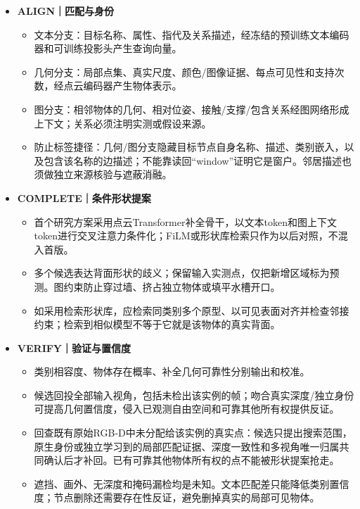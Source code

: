 \documentclass[UTF8,fontset=fandol]{ctexart}
\begin{document}
\begin{itemize}
\item \textbf{ALIGN｜匹配与身份}


\begin{itemize}
\item 文本分支：目标名称、属性、指代及关系描述，经冻结的预训练文本编码器和可训练投影头产生查询向量。


\item 几何分支：局部点集、真实尺度、颜色/图像证据、每点可见性和支持次数，经点云编码器产生物体表示。


\item 图分支：相邻物体的几何、相对位姿、接触/支撑/包含关系经图网络形成上下文；关系必须注明实测或假设来源。


\item 防止标签捷径：几何/图分支隐藏目标节点自身名称、描述、类别嵌入，以及包含该名称的边描述；不能靠读回“window”证明它是窗户。邻居描述也须做独立来源核验与遮蔽消融。

\end{itemize}

\item \textbf{COMPLETE｜条件形状提案}


\begin{itemize}
\item 首个研究方案采用点云Transformer补全骨干，以文本token和图上下文token进行交叉注意力条件化；FiLM或形状库检索只作为以后对照，不混入首版。


\item 多个候选表达背面形状的歧义；保留输入实测点，仅把新增区域标为预测。图约束防止穿过墙、挤占独立物体或填平水槽开口。


\item 如采用检索形状库，应检索同类别多个原型、以可见表面对齐并检查邻接约束；检索到相似模型不等于它就是该物体的真实背面。

\end{itemize}

\item \textbf{VERIFY｜验证与置信度}


\begin{itemize}
\item 类别相容度、物体存在概率、补全几何可靠性分别输出和校准。


\item 候选回投全部输入视角，包括未检出该实例的帧；吻合真实深度/独立身份可提高几何置信度，侵入已观测自由空间和可靠其他所有权提供反证。


\item 回查既有原始RGB-D中未分配给该实例的真实点：候选只提出搜索范围，原生身份或独立学习到的局部匹配证据、深度一致性和多视角唯一归属共同确认后才补回。已有可靠其他物体所有权的点不能被形状提案抢走。


\item 遮挡、画外、无深度和掩码漏检均是未知。文本匹配差只能降低类别置信度；节点删除还需要存在性反证，避免删掉真实的局部可见物体。

\end{itemize}
\end{itemize}
\end{document}
